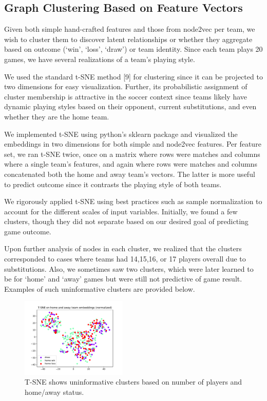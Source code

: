 \subsection{Graph Clustering Based on Feature Vectors}
Given both simple hand-crafted features and those from node2vec per team, we wish to cluster them to discover latent relationships or whether they aggregate based on outcome (`win', `loss', `draw') or team identity. Since each team plays 20 games, we have several realizations of a team's playing style.

We used the standard t-SNE method [9] for clustering since it can be projected to two dimensions for easy visualization. Further, its probabilistic assignment of cluster membership is attractive in the soccer context since teams likely have dynamic playing styles based on their opponent, current substitutions, and even whether they are the home team.

We implemented t-SNE using python's  sklearn package and visualized the embeddings in two dimensions for both simple and node2vec features. Per feature set, we ran t-SNE twice, once on a matrix where rows were matches and columns where a single team's features, and again where rows were matches and columns concatenated both the home and away team's vectors. The latter is more useful to predict outcome since it contrasts the playing style of both teams.

We rigorously applied t-SNE using best practices such as sample normalization to account for the different scales of input variables. Initially, we found a few clusters, though they did not separate based on our desired goal of predicting game outcome.


Upon further analysis of nodes in each cluster, we realized that the clusters corresponded to cases where teams had 14,15,16, or 17 players overall due to substitutions. Also, we sometimes saw two clusters, which were later learned to be for `home' and `away' games but were still not predictive of game result. Examples of such uninformative clusters are provided below. 

\begin{figure}[h]
  \centering
  \includegraphics[width=0.45\textwidth]{plots/game_NORM_tsne.pdf}
  \caption{T-SNE shows uninformative clusters based on number of players and home/away status.}
    \label{fig:tsne_game}
\end{figure}


